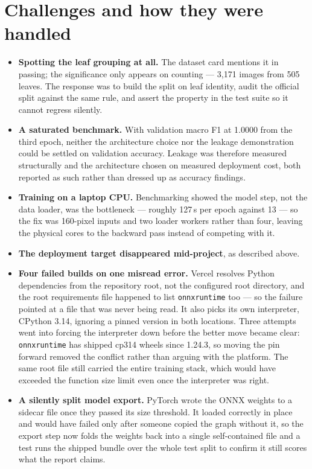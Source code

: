 \documentclass[10pt,a4paper]{article}
\begin{document}
\section{Challenges and how they were handled}

\begin{itemize}
\item \textbf{Spotting the leaf grouping at all.} The dataset card mentions it in
passing; the significance only appears on counting --- 3{,}171 images from 505 leaves.
The response was to build the split on leaf identity, audit the official split against
the same rule, and assert the property in the test suite so it cannot regress silently.
\item \textbf{A saturated benchmark.} With validation macro F1 at 1.0000 from the third
epoch, neither the architecture choice nor the leakage demonstration could be settled on
validation accuracy. Leakage was therefore measured structurally and the architecture
chosen on measured deployment cost, both reported as such rather than dressed up as
accuracy findings.
\item \textbf{Training on a laptop CPU.} Benchmarking showed the model step, not the
data loader, was the bottleneck --- roughly 127\,s per epoch against 13 --- so the fix
was 160-pixel inputs and two loader workers rather than four, leaving the physical cores
to the backward pass instead of competing with it.
\item \textbf{The deployment target disappeared mid-project}, as described above.
\item \textbf{Four failed builds on one misread error.} Vercel resolves Python
dependencies from the repository root, not the configured root directory, and the root
requirements file happened to list \texttt{onnxruntime} too --- so the failure pointed
at a file that was never being read. It also picks its own interpreter, CPython 3.14,
ignoring a pinned version in both locations. Three attempts went into forcing the
interpreter down before the better move became clear: \texttt{onnxruntime} has shipped
cp314 wheels since 1.24.3, so moving the pin forward removed the conflict rather than
arguing with the platform. The same root file still carried the entire training stack,
which would have exceeded the function size limit even once the interpreter was right.
\item \textbf{A silently split model export.} PyTorch wrote the ONNX weights to a
sidecar file once they passed its size threshold. It loaded correctly in place and would
have failed only after someone copied the graph without it, so the export step now folds
the weights back into a single self-contained file and a test runs the shipped bundle
over the whole test split to confirm it still scores what the report claims.
\end{itemize}
\end{document}
